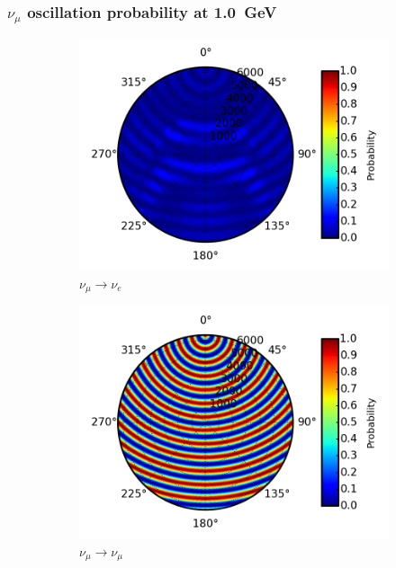 \documentclass{beamer}
\begin{document}
\begin{frame}
	\frametitle{$\nu_{\mu}$ oscillation probability at \SI{1.0}{GeV}}
	\begin{figure}
		\centering
		\begin{subfigure}[b]{0.33\linewidth}
			\caption{ $\nu_{\mu} \rightarrow \nu_{e}$ }
			\includegraphics[width=\linewidth]{earth_1.0gev_numu2nue_throughEarth.png}
		\end{subfigure}
		\begin{subfigure}[b]{0.33\linewidth}
			\caption{ $\nu_{\mu} \rightarrow \nu_{\mu}$ }
			\includegraphics[width=\linewidth]{earth_1.0gev_numu2numu_throughEarth.png}
		\end{subfigure}
		\begin{subfigure}[b]{0.33\linewidth}

\end{subfigure}
\end{figure}
\end{frame}
\end{document}
